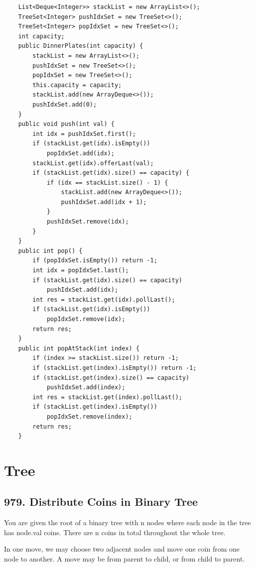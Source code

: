 \documentclass[9pt, b5paaper]{book}
\begin{document}
\begin{verbatim}
    List<Deque<Integer>> stackList = new ArrayList<>();
    TreeSet<Integer> pushIdxSet = new TreeSet<>();
    TreeSet<Integer> popIdxSet = new TreeSet<>();
    int capacity;
    public DinnerPlates(int capacity) {
        stackList = new ArrayList<>();
        pushIdxSet = new TreeSet<>();
        popIdxSet = new TreeSet<>();
        this.capacity = capacity;
        stackList.add(new ArrayDeque<>());
        pushIdxSet.add(0);
    }
    public void push(int val) {
        int idx = pushIdxSet.first();
        if (stackList.get(idx).isEmpty()) 
            popIdxSet.add(idx);
        stackList.get(idx).offerLast(val);
        if (stackList.get(idx).size() == capacity) {
            if (idx == stackList.size() - 1) {
                stackList.add(new ArrayDeque<>());
                pushIdxSet.add(idx + 1);
            }
            pushIdxSet.remove(idx);
        }
    }
    public int pop() {
        if (popIdxSet.isEmpty()) return -1;
        int idx = popIdxSet.last();
        if (stackList.get(idx).size() == capacity)
            pushIdxSet.add(idx);
        int res = stackList.get(idx).pollLast();
        if (stackList.get(idx).isEmpty())
            popIdxSet.remove(idx);
        return res;
    }
    public int popAtStack(int index) {
        if (index >= stackList.size()) return -1;
        if (stackList.get(index).isEmpty()) return -1;
        if (stackList.get(index).size() == capacity)
            pushIdxSet.add(index);
        int res = stackList.get(index).pollLast();
        if (stackList.get(index).isEmpty()) 
            popIdxSet.remove(index);
        return res;
    }
\end{verbatim}


\chapter{Tree}
\label{sec-4}
\section{979. Distribute Coins in Binary Tree}
\label{sec-4-1}
You are given the root of a binary tree with n nodes where each node in the tree has node.val coins. There are n coins in total throughout the whole tree.

In one move, we may choose two adjacent nodes and move one coin from one node to another. A move may be from parent to child, or from child to parent.
\end{document}
